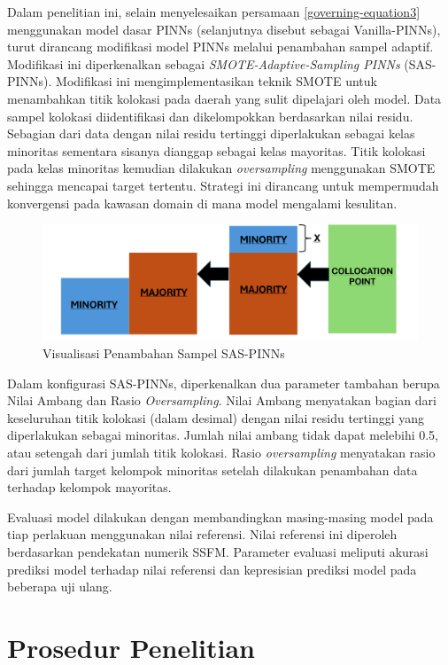Dalam penelitian ini, selain menyelesaikan persamaan \eqref{governing-equation3} menggunakan model dasar PINNs (selanjutnya disebut sebagai Vanilla-PINNs), turut dirancang modifikasi model PINNs melalui penambahan sampel adaptif. Modifikasi ini diperkenalkan sebagai \emph{SMOTE-Adaptive-Sampling PINNs} (SAS-PINNs). Modifikasi ini mengimplementasikan teknik SMOTE untuk menambahkan titik kolokasi pada daerah yang sulit dipelajari oleh model. Data sampel kolokasi diidentifikasi dan dikelompokkan berdasarkan nilai residu. Sebagian dari data dengan nilai residu tertinggi diperlakukan sebagai kelas minoritas sementara sisanya dianggap sebagai kelas mayoritas. Titik kolokasi pada kelas minoritas kemudian dilakukan \emph{oversampling} menggunakan SMOTE sehingga mencapai target tertentu. Strategi ini dirancang untuk mempermudah konvergensi pada kawasan domain di mana model mengalami kesulitan.

\begin{figure}[htbp]
    \centering
    \includegraphics[width=0.8\linewidth]{Gambar/SAS-PINNs-TR.png}
    \caption{Visualisasi Penambahan Sampel SAS-PINNs} 
    \label{fig:SASviz}
\end{figure}

Dalam konfigurasi SAS-PINNs, diperkenalkan dua parameter tambahan berupa Nilai Ambang dan Rasio \emph{Oversampling}. Nilai Ambang menyatakan bagian dari keseluruhan titik kolokasi (dalam desimal) dengan nilai residu tertinggi yang diperlakukan sebagai minoritas. Jumlah nilai ambang tidak dapat melebihi 0.5, atau setengah dari jumlah titik kolokasi. Rasio \emph{oversampling} menyatakan rasio dari jumlah target kelompok minoritas setelah dilakukan penambahan data terhadap kelompok mayoritas.

Evaluasi model dilakukan dengan membandingkan masing-masing model pada tiap perlakuan menggunakan nilai referensi. Nilai referensi ini diperoleh berdasarkan pendekatan numerik SSFM. Parameter evaluasi meliputi akurasi prediksi model terhadap nilai referensi dan kepresisian prediksi model pada beberapa uji ulang. 
\newpage 
\section{Prosedur Penelitian}

